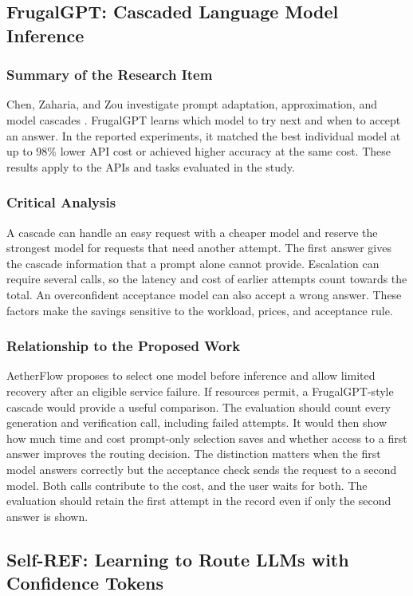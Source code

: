 \documentclass{FastFyp}
\begin{document}
\subsection{FrugalGPT: Cascaded Language Model Inference}
\subsubsection{Summary of the Research Item}
Chen, Zaharia, and Zou investigate prompt adaptation, approximation, and model cascades \cite{ref:FrugalGPT}. FrugalGPT learns which model to try next and when to accept an answer. In the reported experiments, it matched the best individual model at up to 98\% lower API cost or achieved higher accuracy at the same cost. These results apply to the APIs and tasks evaluated in the study.

\subsubsection{Critical Analysis}
A cascade can handle an easy request with a cheaper model and reserve the strongest model for requests that need another attempt. The first answer gives the cascade information that a prompt alone cannot provide. Escalation can require several calls, so the latency and cost of earlier attempts count towards the total. An overconfident acceptance model can also accept a wrong answer. These factors make the savings sensitive to the workload, prices, and acceptance rule.

\subsubsection{Relationship to the Proposed Work}
AetherFlow proposes to select one model before inference and allow limited recovery after an eligible service failure. If resources permit, a FrugalGPT-style cascade would provide a useful comparison. The evaluation should count every generation and verification call, including failed attempts. It would then show how much time and cost prompt-only selection saves and whether access to a first answer improves the routing decision. The distinction matters when the first model answers correctly but the acceptance check sends the request to a second model. Both calls contribute to the cost, and the user waits for both. The evaluation should retain the first attempt in the record even if only the second answer is shown.

\subsection{Self-REF: Learning to Route LLMs with Confidence Tokens}
\end{document}
